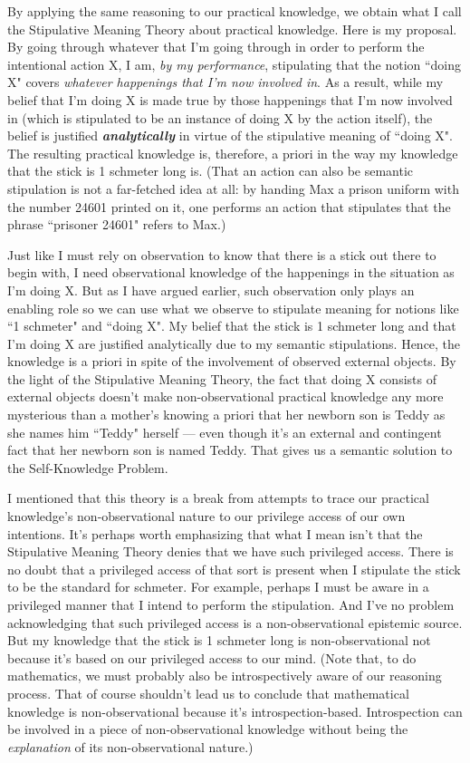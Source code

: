 \documentclass[a4paper,12pt]{article}
\begin{document}
By applying the same reasoning to our practical knowledge, we obtain what I call the Stipulative Meaning Theory about practical knowledge. Here is my proposal. By going through whatever that I'm going through in order to perform the intentional action X, I am, \emph{by my performance}, stipulating that the notion ``doing X" covers \emph{whatever happenings that I'm now involved in}. As a result, while my belief that I'm doing X is made true by those happenings that I'm now involved in (which is stipulated to be an instance of doing X by the action itself), the belief is justified \emph{\textbf{analytically}} in virtue of the stipulative meaning of ``doing X". The resulting practical knowledge is, therefore, a priori in the way my knowledge that the stick is 1 schmeter long is. (That an action can also be semantic stipulation is not a far-fetched idea at all: by handing Max a prison uniform with the number 24601 printed on it, one performs an action that stipulates that the phrase ``prisoner 24601" refers to Max.)

Just like I must rely on observation to know that there is a stick out there to begin with, I need observational knowledge of the happenings in the situation as I'm doing X. But as I have argued earlier, such observation only plays an enabling role so we can use what we observe to stipulate meaning for notions like ``1 schmeter" and ``doing X". My belief that the stick is 1 schmeter long and that I'm doing X are justified analytically due to my semantic stipulations. Hence, the knowledge is a priori in spite of the involvement of observed external objects. By the light of the Stipulative Meaning Theory, the fact that doing X consists of external objects doesn't make non-observational practical knowledge any more mysterious than a mother's knowing a priori that her newborn son is Teddy as she names him ``Teddy" herself --- even though it's an external and contingent fact that her newborn son is named Teddy. That gives us a semantic solution to the Self-Knowledge Problem.

I mentioned that this theory is a break from attempts to trace our practical knowledge's non-observational nature to our privilege access of our own intentions. It's perhaps worth emphasizing that what I mean isn't that the Stipulative Meaning Theory denies that we have such privileged access. There is no doubt that a privileged access of that sort is present when I stipulate the stick to be the standard for schmeter. For example, perhaps I must be aware in a privileged manner that I intend to perform the stipulation. And I've no problem acknowledging that such privileged access is a non-observational epistemic source. But my knowledge that the stick is 1 schmeter long is non-observational not because it's based on our privileged access to our mind. (Note that, to do mathematics, we must probably also be introspectively aware of our reasoning process. That of course shouldn't lead us to conclude that mathematical knowledge is non-observational because it's introspection-based. Introspection can be involved in a piece of non-observational knowledge without being the \emph{explanation} of its non-observational nature.)
\end{document}
